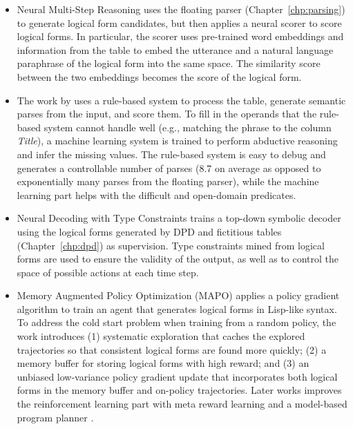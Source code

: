 \begin{itemize}

\item Neural Multi-Step Reasoning \cite{haug2018neural}
uses the floating parser (Chapter~\ref{chp:parsing})
to generate logical form candidates,
but then applies a neural scorer to score logical forms.
In particular, the scorer uses
pre-trained word embeddings and information from the table to
embed the utterance
and a natural language paraphrase of the logical form
into the same space.
The similarity score between the two embeddings becomes the score
of the logical form.

\item The work by \citet{dhamdhere2017analyza,dhamdhere2017abductive}
uses a rule-based system to
process the table,
generate semantic parses from the input,
and score them.
To fill in the operands that the rule-based system cannot handle well
(e.g., matching the phrase  to the column \emph{Title}),
a machine learning system is trained to perform abductive reasoning
and infer the missing values.
The rule-based system is easy to debug
and generates a controllable number of parses
(8.7 on average as opposed to exponentially many parses from the
floating parser),
while the machine learning part helps with
the difficult and open-domain predicates.

\item Neural Decoding with Type Constraints \cite{krishnamurthy2017neural}
trains a top-down symbolic decoder using the logical forms
generated by DPD and fictitious tables (Chapter~\ref{chp:dpd})
as supervision.
Type constraints mined from logical forms
are used to ensure the validity of the output,
as well as to control the space of possible actions at each time step.

\item Memory Augmented Policy Optimization (MAPO) \cite{liang2018mapo}
applies a policy gradient algorithm to train an agent
that generates logical forms in Lisp-like syntax.
To address the cold start problem when training from a random policy,
the work introduces (1)
systematic exploration that caches the explored trajectories
so that consistent logical forms are found more quickly;
(2) a memory buffer
for storing logical forms with high reward;
and (3) an unbiased low-variance policy gradient update
that incorporates both logical forms in the memory buffer
and on-policy trajectories.
Later works improves the reinforcement learning part
with meta reward learning \cite{agarwal2019learning}
and a model-based program planner \cite{biloki2019neural}.



\end{itemize}


